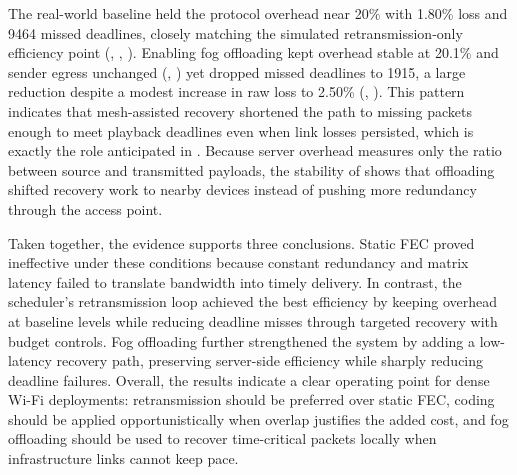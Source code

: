 \quad The real-world baseline held the protocol overhead near 20\% with 1.80\% loss and 9464 missed deadlines, closely matching the simulated retransmission-only efficiency point (\textbf{}, \textbf{}, \textbf{}). Enabling fog offloading kept overhead stable at 20.1\% and sender egress unchanged (\textbf{}, \textbf{}) yet dropped missed deadlines to 1915, a large reduction despite a modest increase in raw loss to 2.50\% (\textbf{}, \textbf{}). This pattern indicates that mesh-assisted recovery shortened the path to missing packets enough to meet playback deadlines even when link losses persisted, which is exactly the role anticipated in \textbf{}. Because server overhead measures only the ratio between source and transmitted payloads, the stability of \textbf{} shows that offloading shifted recovery work to nearby devices instead of pushing more redundancy through the access point.

\quad Taken together, the evidence supports three conclusions. Static FEC proved ineffective under these conditions because constant redundancy and matrix latency failed to translate bandwidth into timely delivery. In contrast, the scheduler’s retransmission loop achieved the best efficiency by keeping overhead at baseline levels while reducing deadline misses through targeted recovery with budget controls. Fog offloading further strengthened the system by adding a low-latency recovery path, preserving server-side efficiency while sharply reducing deadline failures. Overall, the results indicate a clear operating point for dense Wi-Fi deployments: retransmission should be preferred over static FEC, coding should be applied opportunistically when overlap justifies the added cost, and fog offloading should be used to recover time-critical packets locally when infrastructure links cannot keep pace.

